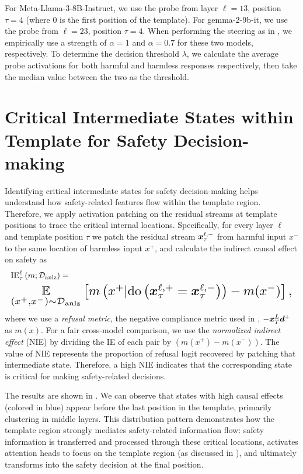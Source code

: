 For Meta-Llama-3-8B-Instruct, we use the probe from layer \(\ell=13\), position \(\tau=4\) (where \(0\) is the first position of the template). For gemma-2-9b-it, we use the probe from \(\ell=23\), position \(\tau=4\). When performing the steering as in , we empirically use a strength of \(\alpha=1\) and \(\alpha=0.7\) for these two models, respectively.
To determine the decision threshold \(\lambda\), we calculate the average probe activations for both harmful and harmless responses respectively, then take the median value between the two as the threshold.


\section{Critical Intermediate States within Template for Safety Decision-making}
\label{appendix:temp_resid_patch}



Identifying critical intermediate states for safety decision-making helps understand how safety-related features flow within the template region.
Therefore, we apply activation patching on the residual streams at template positions to trace the critical internal locations.
Specifically, for every layer \(\ell\) and template position \(\tau\) we patch the residual stream \({\bm{x}}^{\ell,-}_{\tau}\) from harmful input \(x^-\) to the same location of harmless input \(x^+\), and calculate the indirect causal effect on safety as
\begin{align}
     &\mathrm{IE}^{\ell}_{\tau}\left(m;\gD_{\text{anlz}}\right) =  \nonumber\\ &\resizebox{\linewidth}{!}{$\underset{\left(x^{+},x^{-}\right)\sim\gD_{\text{anlz}}}{\E}\left[m\left(x^{+}|\mathrm{do}\left(\vx_{\tau}^{\ell,+}=\vx_{\tau}^{\ell,-}\right)\right) - m(x^{-})\right],$} \nonumber
\end{align}
where we use a \textit{refusal metric}, the negative compliance metric used in , \(-{\bm{x}}_T^L{\bm{d}}^+\) as \(m(x)\).
For a fair cross-model comparison, we use the \textit{normalized indirect effect} (NIE) by dividing the IE of each pair by \( (m(x^+)-m(x^-)) \). 
The value of NIE represents the proportion of refusal logit recovered by patching that intermediate state. Therefore, a high NIE indicates that the corresponding state is critical for making safety-related decisions.

The results are shown in . We can observe that states with high causal effects (colored in blue) appear before the last position in the template, primarily clustering in middle layers. This distribution pattern demonstrates how the template region strongly mediates safety-related information flow: safety information is transferred and processed through these critical locations, activates attention heads to focus on the template region (as discussed in ), and ultimately transforms into the safety decision at the final position.

